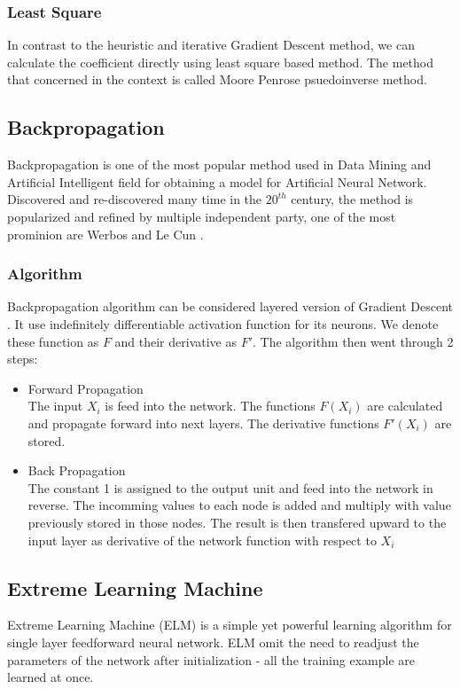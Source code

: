 \documentclass[13pt]{article}
\begin{document}
\subsubsection{Least Square}
In contrast to the heuristic and iterative Gradient Descent method, we can calculate the coefficient directly using least square based method. The method that concerned in the context is called Moore Penrose psuedoinverse method. 
\subsection{Backpropagation}
Backpropagation is one of the most popular method used in Data Mining and Artificial Intelligent field for obtaining a model for Artificial Neural Network. Discovered and re-discovered many time in the $20^{th}$ century, the method is popularized and refined by multiple independent party, one of the most prominion are Werbos and Le Cun \cite{lecun_theoretical_1992}.
\subsubsection{Algorithm}
Backpropagation algorithm can be considered layered version of Gradient Descent \cite{bishop_pattern_2006}. It use indefinitely differentiable activation function for its neurons. We denote these function as $F$ and their derivative as $F'$. The algorithm then went through 2 steps: \cite[161]{rojas_neural_1996}
\begin{itemize}
\item Forward Propagation\\
The input $X_i$ is feed into the network. The functions $F(X_i)$ are calculated and propagate forward into next layers. The derivative functions $F'(X_i)$ are stored.
\item Back Propagation\\
The constant 1 is assigned to the output unit and feed into the network in reverse. The incomming values to each node is added and multiply with value previously stored in those nodes. The result is then transfered upward to the input layer as derivative of the network function with respect to $X_i$
\end{itemize}
\subsection{Extreme Learning Machine}
Extreme Learning Machine (ELM) \cite{huang_extreme_2016} is a simple yet powerful learning algorithm for single layer feedforward neural network. ELM omit the need to readjust the parameters of the network after initialization - all the training example are learned at once.
\end{document}
